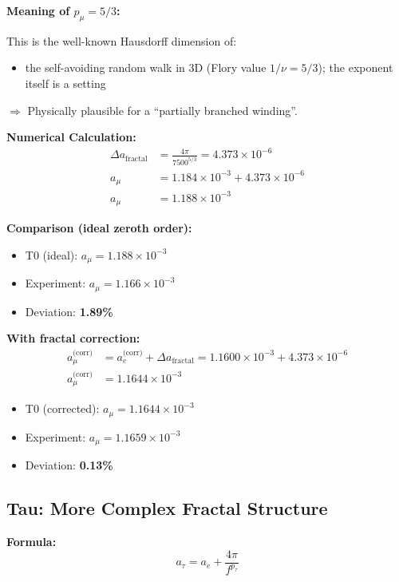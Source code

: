 	\textbf{Meaning of $p_\mu = 5/3$:}
	
	This is the well-known Hausdorff dimension of:
	\begin{itemize}
		\item the self-avoiding random walk in 3D (Flory value $1/\nu = 5/3$); the exponent itself is a setting
	\end{itemize}
	
	$\Rightarrow$ Physically plausible for a ``partially branched winding''.
	
	\textbf{Numerical Calculation:}
	\begin{align}
		\Delta a_{\text{fractal}} &= \frac{4\pi}{7500^{5/3}} = 4.373 \times 10^{-6} \\
		a_\mu &= 1.184 \times 10^{-3} + 4.373 \times 10^{-6} \\
		a_\mu &= 1.188 \times 10^{-3}
	\end{align}
	
	\textbf{Comparison (ideal zeroth order):}
	\begin{itemize}
		\item T0 (ideal): $a_\mu = 1.188 \times 10^{-3}$
		\item Experiment: $a_\mu = 1.166 \times 10^{-3}$
		\item Deviation: \textbf{1.89\%}
	\end{itemize}
	
	\textbf{With fractal correction:}
	\begin{align}
		a_\mu^\text{(corr)} &= a_e^\text{(corr)} + \Delta a_\text{fractal} = 1.1600 \times 10^{-3} + 4.373 \times 10^{-6} \\
		a_\mu^\text{(corr)} &= 1.1644 \times 10^{-3}
	\end{align}
	\begin{itemize}
		\item T0 (corrected): $a_\mu = 1.1644 \times 10^{-3}$
		\item Experiment: $a_\mu = 1.1659 \times 10^{-3}$
		\item Deviation: \textbf{0.13\%}
	\end{itemize}
	
	\subsection{Tau: More Complex Fractal Structure}
	
	\textbf{Formula:}
	\begin{equation}
		a_\tau = a_e + \frac{4\pi}{f^{p_\tau}}
		\label{eq:atau}
	\end{equation}
	
